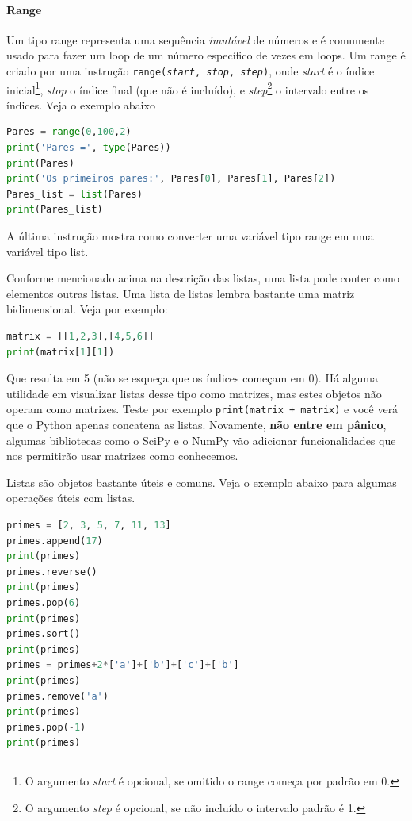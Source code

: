 \paragraph{Range} Um tipo range representa uma sequência {\it imutável} de números e é comumente usado para fazer um loop de um número específico de vezes em loops. Um range é criado por uma instrução {\tt range({\it start}, {\it stop}, {\it step})}, onde {\it start} é o índice inicial\footnote{O argumento {\it start} é opcional, se omitido o range começa por padrão em 0.}, {\it stop} o índice final (que não é incluído), e {\it step}\footnote{O argumento {\it step} é opcional, se não incluído o intervalo padrão é 1.}  o intervalo entre os índices. Veja o exemplo abaixo
\begin{lstlisting}[language=Python]
Pares = range(0,100,2)
print('Pares =', type(Pares))
print(Pares)
print('Os primeiros pares:', Pares[0], Pares[1], Pares[2])
Pares_list = list(Pares)
print(Pares_list)
\end{lstlisting}
A última instrução mostra como converter uma variável tipo range em uma variável tipo list.

Conforme mencionado acima na descrição das listas, uma lista pode conter como elementos outras listas. Uma lista de listas lembra bastante uma matriz bidimensional. Veja por exemplo:
\begin{lstlisting}[language=Python]
matrix = [[1,2,3],[4,5,6]]
print(matrix[1][1])
\end{lstlisting}
Que resulta em 5 (não se esqueça que os índices começam em 0). Há alguma utilidade em visualizar listas desse tipo como matrizes, mas estes objetos não operam como matrizes. Teste por exemplo {\tt print(matrix + matrix)} e você verá que o Python apenas concatena as listas. Novamente, {\bf não entre em pânico}, algumas bibliotecas como o SciPy e o NumPy vão adicionar funcionalidades que nos permitirão usar matrizes como conhecemos.

Listas são objetos bastante úteis e comuns. Veja o exemplo abaixo para algumas operações úteis com listas.
\begin{lstlisting}[language=Python]
primes = [2, 3, 5, 7, 11, 13]
primes.append(17)
print(primes)
primes.reverse()
print(primes)
primes.pop(6)
print(primes)
primes.sort()
print(primes)
primes = primes+2*['a']+['b']+['c']+['b']
print(primes)
primes.remove('a')
print(primes)
primes.pop(-1)
print(primes)
\end{lstlisting}

